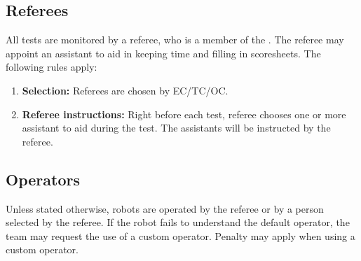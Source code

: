 \subsection{Referees}
\label{rule:referees}
All tests are monitored by a referee, who is a member of the . The referee may appoint an assistant to aid in keeping time and filling in scoresheets. 
The following rules apply:

\begin{enumerate}
	\item \textbf{Selection:} Referees are chosen by EC/TC/OC.

	\item \textbf{Referee instructions:} Right before each test, referee chooses one or more assistant to aid during the test. The assistants will be instructed by the referee.
\end{enumerate}


\subsection{Operators}
\label{rule:operator}
Unless stated otherwise, robots are operated by the referee or by a person selected by the referee.
If the robot fails to understand the default operator, the team may request the use of a custom operator.
Penalty may apply when using a custom operator.


